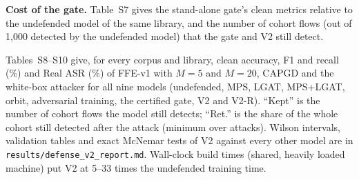 \textbf{Cost of the gate.} Table~S7 gives the stand-alone gate's clean metrics relative to the undefended model of the same library, and the number of cohort flows (out of 1,000 detected by the undefended model) that the gate and V2 still detect.

\begin{table}[!htbp]
\centering
\caption*{Table S7. Stand-alone certified gate minus undefended model (accuracy, F1, recall; percentage points) and cohort flows still detected.}
\footnotesize

\end{table}

Tables~S8--S10 give, for every corpus and library, clean accuracy, F1 and recall (\%) and Real ASR (\%) of FFE-v1 with $M=5$ and $M=20$, CAPGD and the white-box attacker for all nine models (undefended, MPS, LGAT, MPS+LGAT, orbit, adversarial training, the certified gate, V2 and V2-R). ``Kept'' is the number of cohort flows the model still detects; ``Ret.'' is the share of the whole cohort still detected after the attack (minimum over attacks). Wilson intervals, validation tables and exact McNemar tests of V2 against every other model are in \texttt{results/defense\_v2\_report.md}. Wall-clock build times (shared, heavily loaded machine) put V2 at 5--33 times the undefended training time.

\begin{table}[!htbp]
\centering
\caption*{Table S8. CSE-CIC-IDS2018: all defense models, all attacks.}
\scriptsize
\resizebox{\textwidth}{!}{%
%
}
\end{table}

\begin{table}[!htbp]
\centering
\caption*{Table S9. CIC-IDS2017: all defense models, all attacks.}
\scriptsize
\resizebox{\textwidth}{!}{%
%
}
\end{table}

\begin{table}[!htbp]
\centering
\caption*{Table S10. UNSW-NB15: all defense models, all attacks.}
\scriptsize
\resizebox{\textwidth}{!}{%
%
}
\end{table}

\begin{table}[!htbp]
\centering
\caption*{Table S11. Components selected on the validation split (free classifier, gate threshold $\tau$) and their validation Real ASR (\%).}
\footnotesize

\end{table}

